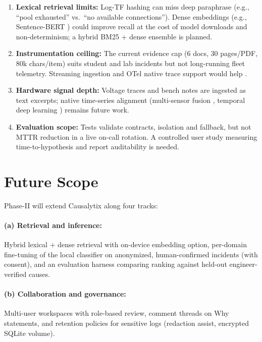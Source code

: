 \documentclass[12pt,a4paper,oneside]{report}
\begin{document}
\begin{enumerate}
\item \textbf{Lexical retrieval limits:} Log-TF hashing can miss deep paraphrase (e.g., ``pool exhausted'' vs.\ ``no available connections''). Dense embeddings (e.g., Sentence-BERT \cite{reimers2019sentencebert}) could improve recall at the cost of model downloads and non-determinism; a hybrid BM25 + dense ensemble \cite{robertson2009probabilistic,izacard2021leveraging} is planned.
\item \textbf{Instrumentation ceiling:} The current evidence cap (6 docs, 30 pages/PDF, 80k chars/item) suits student and lab incidents but not long-running fleet telemetry. Streaming ingestion and OTel native trace support would help \cite{soldani2022anomaly,wang2024comprehensive}.
\item \textbf{Hardware signal depth:} Voltage traces and bench notes are ingested as text excerpts; native time-series alignment (multi-sensor fusion \cite{ran2021robust}, temporal deep learning \cite{angelopoulos2022hardware}) remains future work.
\item \textbf{Evaluation scope:} Tests validate contracts, isolation and fallback, but not MTTR reduction in a live on-call rotation. A controlled user study measuring time-to-hypothesis and report auditability is needed.
\end{enumerate}

\section{Future Scope}
Phase-II will extend Causalytix along four tracks:

\paragraph{(a) Retrieval and inference:} Hybrid lexical + dense retrieval with on-device embedding option, per-domain fine-tuning of the local classifier on anonymized, human-confirmed incidents (with consent), and an evaluation harness comparing ranking against held-out engineer-verified causes.

\paragraph{(b) Collaboration and governance:} Multi-user workspaces with role-based review, comment threads on Why statements, and retention policies for sensitive logs (redaction assist, encrypted SQLite volume).
\end{document}

